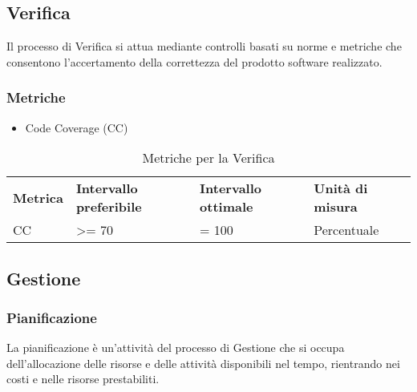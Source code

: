 \subsection{Verifica}
Il processo di Verifica si attua mediante controlli basati su norme e metriche che consentono l'accertamento della correttezza del prodotto software realizzato.
\subsubsection{Metriche}
\begin{itemize}
	\item Code Coverage (CC)
\end{itemize}

\renewcommand{\arraystretch}{2.2}
\begin{longtable}{|C{2.5cm}|C{3.25cm}|C{3.25cm}|C{3cm}|}

	\caption{Metriche per la Verifica}\\
	\hline

	\textbf{Metrica} & \textbf{Intervallo preferibile}  & \textbf{Intervallo ottimale} & \textbf{Unità di misura}
	\tabularnewline
	\endfirsthead

	CC & >= 70  & = 100 & Percentuale \\

\end{longtable}


\subsection{Gestione}
\subsubsection{Pianificazione}
La pianificazione è un'attività del processo di Gestione che si occupa dell'allocazione delle risorse e delle attività disponibili nel tempo, rientrando nei costi e nelle risorse prestabiliti.
